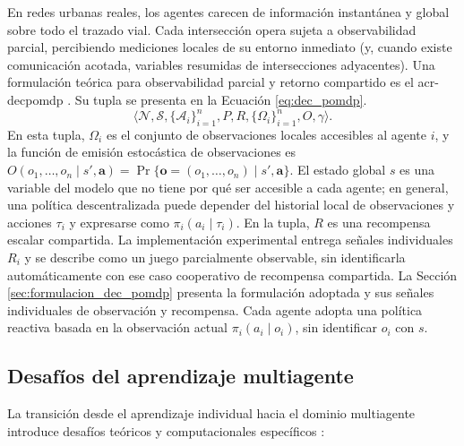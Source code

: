 En redes urbanas reales, los agentes carecen de información instantánea y global sobre todo el trazado vial. Cada intersección opera sujeta a observabilidad parcial, percibiendo mediciones locales de su entorno inmediato (y, cuando existe comunicación acotada, variables resumidas de intersecciones adyacentes). Una formulación teórica para observabilidad parcial y retorno compartido es el \gls{acr-decpomdp} \cite{decpomdp-survey}. Su tupla se presenta en la Ecuación \eqref{eq:dec_pomdp}.
\begin{equation}
    \langle \mathcal{N}, \mathcal{S}, \{ \mathcal{A}_i \}_{i=1}^n, P, R, \{ \Omega_i \}_{i=1}^n, O, \gamma \rangle.
    \label{eq:dec_pomdp}
\end{equation}
    En esta tupla, $\Omega_i$ es el conjunto de observaciones locales accesibles al agente $i$, y la función de emisión estocástica de observaciones es $O(o_1, \dots, o_n \mid s', \mathbf{a}) = \Pr\{\mathbf{o} = (o_1, \dots, o_n) \mid s', \mathbf{a}\}$. El estado global $s$ es una variable del modelo que no tiene por qué ser accesible a cada agente; en general, una política descentralizada puede depender del historial local de observaciones y acciones $\tau_i$ y expresarse como $\pi_i(a_i \mid \tau_i)$. En la tupla, $R$ es una recompensa escalar compartida. La implementación experimental entrega señales individuales $R_i$ y se describe como un juego parcialmente observable, sin identificarla automáticamente con ese caso cooperativo de recompensa compartida. La Sección \ref{sec:formulacion_dec_pomdp} presenta la formulación adoptada y sus señales individuales de observación y recompensa. Cada agente adopta una política reactiva basada en la observación actual $\pi_i(a_i \mid o_i)$, sin identificar $o_i$ con $s$.



\subsection{Desafíos del aprendizaje multiagente}

La transición desde el aprendizaje individual hacia el dominio multiagente introduce desafíos teóricos y computacionales específicos \cite{marlbook}:

